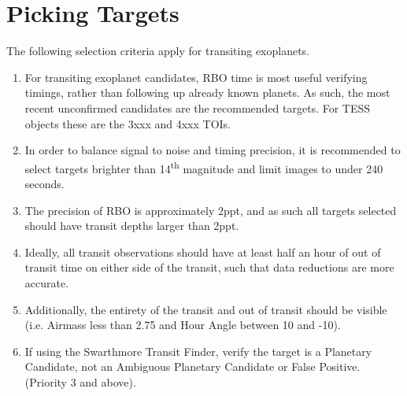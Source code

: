 \documentclass[letterpaper,12pt]{article}
\begin{document}
\section{Picking Targets}\label{app:targets}
The following selection criteria apply for transiting exoplanets.
\begin{enumerate}
\item For transiting exoplanet candidates, RBO time is most useful verifying timings, rather than following up already known planets. As such, the most recent unconfirmed candidates are the recommended targets. For TESS objects these are the 3xxx and 4xxx TOIs.
\item In order to balance signal to noise and timing precision, it is recommended to select targets brighter than 14\textsuperscript{th} magnitude and limit images to under 240 seconds.
\item The precision of RBO is approximately 2ppt, and as such all targets selected should have transit depths larger than 2ppt.
\item Ideally, all transit observations should have at least half an hour of out of transit time on either side of the transit, such that data reductions are more accurate.
\item Additionally, the entirety of the transit and out of transit should be visible (i.e. Airmass less than 2.75 and Hour Angle between 10 and -10).
\item If using the Swarthmore Transit Finder, verify the target is a Planetary Candidate, not an Ambiguous Planetary Candidate or False Positive. (Priority 3 and above).
\end{enumerate}
\end{document}
